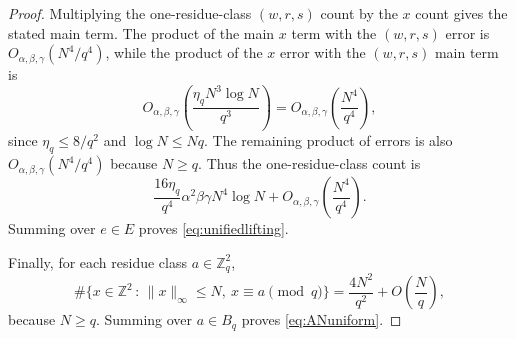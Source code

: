 \documentclass[11pt,reqno]{amsart}
\numberwithin{equation}{section}
\newcommand{\norm}[1]{\lVert #1\rVert_\infty}
\renewcommand{\le}{\leqslant}
\renewcommand{\ge}{\geqslant}
\begin{document}
\begin{proof}
Multiplying the one-residue-class $(w,r,s)$ count by the $x$ count gives the stated main term. The product of the main $x$ term with the $(w,r,s)$ error is $O_{\alpha,\beta,\gamma}(N^4/q^4)$, while the product of the $x$ error with the $(w,r,s)$ main term is
\[ O_{\alpha,\beta,\gamma}\!\left(\frac{\eta_q N^3\log N}{q^3}\right)
=O_{\alpha,\beta,\gamma}\!\left(\frac{N^4}{q^4}\right), \]
since $\eta_q\le 8/q^2$ and $\log N\le Nq$. The remaining product of errors is also $O_{\alpha,\beta,\gamma}(N^4/q^4)$ because $N\ge q$. Thus the one-residue-class count is
\[ \frac{16\eta_q}{q^4}\alpha^2\beta\gamma N^4\log N + O_{\alpha,\beta,\gamma}\!\left(\frac{N^4}{q^4}\right). \]
Summing over $e\in E$ proves \eqref{eq:unifiedlifting}.

Finally, for each residue class $a\in\mathbb{Z}_q^2$,
\[ \#\{x\in\mathbb{Z}^2 \,:\, \norm{x}\le N,\ x\equiv a\!\!\!\pmod q\}
=\frac{4N^2}{q^2}+O\left(\frac{N}{q}\right), \]
because $N\ge q$. Summing over $a\in B_q$ proves \eqref{eq:ANuniform}.
\end{proof}
\end{document}

